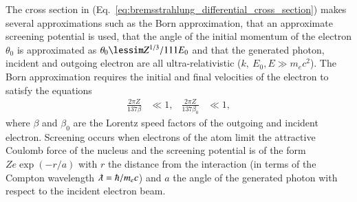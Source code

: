 \documentclass[../main.tex]{subfiles}
\begin{document}
The cross section in (Eq.~\ref{eq:bremsstrahlung_differential_cross_section}) makes several approximations such as the Born approximation, that an approximate screening potential is used, that the angle of the initial momentum of the electron $\theta_{0}$ is approximated as $\theta_{0} \lessim Z^{1/3}/111E_{0}$ and that the generated photon, incident and outgoing electron are all ultra-relativistic ($k,~E_{0},E \gg m_{e}c^{2}$). The Born approximation requires the initial and final velocities of the electron to satisfy the equations
\begin{align}
\frac{2\pi Z}{137\beta} &\ll 1, & \frac{2\pi Z}{137\beta_{0}} &\ll 1,
\label{eq:Born_approximation}    
\end{align}
where $\beta$ and $\beta_{0}$ are the Lorentz speed factors of the outgoing and incident electron. Screening occurs when electrons of the atom limit the attractive Coulomb force of the nucleus and the screening potential is of the form $Ze\exp\left(-r/a\right)$ \cite{schiff1951energy} with $r$ the distance from the interaction (in terms of the Compton wavelength $\lambdabar = \hbar/m_{e}c$) and $a$ the angle of the generated photon with respect to the incident electron beam.
\end{document}
